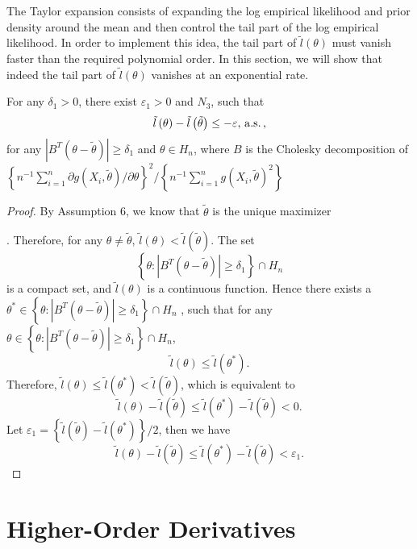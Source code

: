 The Taylor expansion consists of  expanding the log empirical
likelihood and prior density around the mean and  then control
the tail part of the log empirical likelihood. In order to implement
this idea, the tail part of $\tilde{l}\left(\theta\right)$ must vanish
faster than the required polynomial order. In this section,
we will show that indeed the tail part of $\tilde{l}\left(\theta\right)$
vanishes at an exponential rate.
\begin{lemma}
\label{lemma:exponential-decay-tail-2} For any $\delta_{1}>0$, there
exist $\varepsilon_{1}>0$ and $N_{3}$, such that 
\[
\tilde{l}\left(\theta\right)-\tilde{l}\left(\tilde{\theta}\right)\le-\varepsilon,\,\mathrm{a.s.}\,,
\]
for any $\left|B^T\left(\theta-\tilde{\theta}\right)\right|\ge\delta_{1}$
and $\theta\in H_n$, 
where $B$ is the Cholesky decomposition of
 $\left\{ n^{-1}\sum_{i=1}^{n}\partial g\left(X_{i},\tilde{\theta}\right)/\partial\theta\right\} ^{2}/\left\{ n^{-1}\sum_{i=1}^{n}g\left(X_{i},\tilde{\theta}\right)^{2}\right\} $
 \end{lemma}
\begin{proof}
By Assumption 6, we know that $\tilde{\theta}$ is the unique maximizer%

. Therefore, for any $\theta\neq\tilde{\theta}$, $\tilde{l}\left(\theta\right)<\tilde{l}\left(\tilde{\theta}\right)$.
The set 
\[
\left\{ \theta:\left|B^T\left(\theta-\tilde{\theta}\right)\right|\ge\delta_{1}\right\} \cap H_n
\]
is a compact set, and $\tilde{l}\left(\theta\right)$ is a continuous
function. Hence there exists a $\theta^{*}\in\left\{ \theta:\left|B^T\left(\theta-\tilde{\theta}\right)\right|\ge\delta_{1}\right\} \cap H_n$
, such that for any $\theta\in\left\{ \theta:\left|B^T\left(\theta-\tilde{\theta}\right)\right|\ge\delta_{1}\right\} \cap H_n$,
\[
\tilde{l}\left(\theta\right)\le\tilde{l}\left(\theta^{*}\right).
\]
Therefore, $\tilde{l}\left(\theta\right)\le\tilde{l}\left(\theta^{*}\right)<\tilde{l}\left(\tilde{\theta}\right)$, which is equivalent to 
\[
\tilde{l}\left(\theta\right)-\tilde{l}\left(\tilde{\theta}\right)\le\tilde{l}\left(\theta^{*}\right)-\tilde{l}\left(\tilde{\theta}\right)<0.
\]
Let $\varepsilon_{1}=\left\{ \tilde{l}\left(\tilde{\theta}\right)-\tilde{l}\left(\theta^{*}\right)\right\} /2$,
then we have 
\[
\tilde{l}\left(\theta\right)-\tilde{l}\left(\tilde{\theta}\right)\le\tilde{l}\left(\theta^{*}\right)-\tilde{l}\left(\tilde{\theta}\right)<\varepsilon_{1}.
\]

\end{proof}

\section{Higher-Order Derivatives}\label{app:high-order-der}

